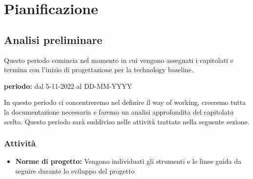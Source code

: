 \section{Pianificazione}
\subsection{Analisi preliminare}
Questo periodo comincia nel momento in cui vengono assegnati i capitolati e termina con l'inizio di progettazione per la technology baseline.\\
\begin{center}
\textbf{periodo:} dal 5-11-2022 al DD-MM-YYYY\\
\end{center}
In questo periodo ci concentreremo nel definire il way of working, creeremo tutta la documentazione necessaria e faremo un analisi approfondita del capitolato scelto.  Questo periodo sarà suddiviso nelle attività trattate nella seguente sezione.
\subsubsection{Attività}
\begin{itemize}
\item \textbf{Norme di progetto:} Vengono individuati gli strumenti e le linee guida da seguire durante lo sviluppo del progetto
\end{itemize}


